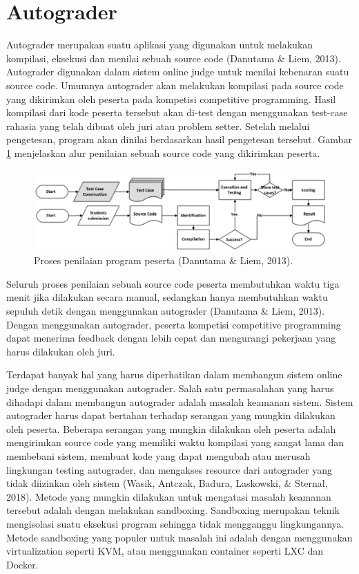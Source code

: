 \section{Autograder}

\par Autograder merupakan suatu aplikasi yang digunakan untuk melakukan kompilasi, eksekusi dan menilai sebuah source code (Danutama \& Liem, 2013). Autograder digunakan dalam sistem online judge untuk menilai kebenaran suatu source code. Umumnya autograder akan melakukan kompilasi pada source code yang dikirimkan oleh peserta pada kompetisi competitive programming. Hasil kompilasi dari kode peserta tersebut akan di-test dengan menggunakan test-case rahasia yang telah dibuat oleh juri atau problem setter. Setelah melalui pengetesan, program akan dinilai berdasarkan hasil pengetesan tersebut. Gambar \ref{fig:grading-process} menjelaskan alur penilaian sebuah source code yang dikirimkan peserta.

\begin{figure}
	\centering
	\includegraphics[width=\textwidth]{images/grading-process}
	\caption{Proses penilaian program peserta (Danutama \& Liem, 2013).}
	\label{fig:grading-process}
\end{figure}

\par Seluruh proses penilaian sebuah source code peserta membutuhkan waktu tiga menit jika dilakukan secara manual, sedangkan hanya membutuhkan waktu sepuluh detik dengan menggunakan autograder (Danutama \& Liem, 2013). Dengan menggunakan autograder, peserta kompetisi competitive programming dapat menerima feedback dengan lebih cepat dan mengurangi pekerjaan yang harus dilakukan oleh juri.

\par Terdapat banyak hal yang harus diperhatikan dalam membangun sistem online judge dengan menggunakan autograder. Salah satu permasalahan yang harus dihadapi dalam membangun autograder adalah masalah keamanan sistem. Sistem autograder harus dapat bertahan terhadap serangan yang mungkin dilakukan oleh peserta. Beberapa serangan yang mungkin dilakukan oleh peserta adalah mengirimkan source code yang memiliki waktu kompilasi yang sangat lama dan membebani sistem, membuat kode yang dapat mengubah atau merusah lingkungan testing autograder, dan mengakses resource dari autograder yang tidak diizinkan oleh sistem (Wasik, Antczak, Badura, Laskowski, \& Sternal, 2018). Metode yang mungkin dilakukan untuk mengatasi masalah keamanan tersebut adalah dengan melakukan sandboxing. Sandboxing merupakan teknik mengisolasi suatu eksekusi program sehingga tidak mengganggu lingkungannya. Metode sandboxing yang populer untuk masalah ini adalah dengan menggunakan virtualization seperti KVM, atau menggunakan container seperti LXC dan Docker.

